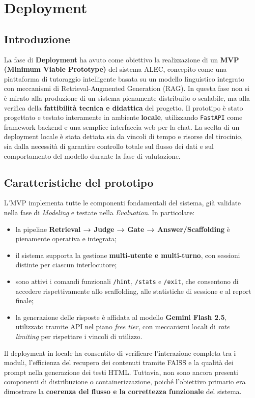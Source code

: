 \documentclass[a4paper,9pt]{article}
\begin{document}
\section{Deployment}

\subsection{Introduzione}

La fase di \textbf{Deployment} ha avuto come obiettivo la realizzazione di un \textbf{MVP (Minimum Viable Prototype)} del sistema ALEC, concepito come una piattaforma di tutoraggio intelligente basata su un modello linguistico integrato con meccanismi di Retrieval-Augmented Generation (RAG). 
In questa fase non si è mirato alla produzione di un sistema pienamente distribuito o scalabile, ma alla verifica della \textbf{fattibilità tecnica e didattica} del progetto.
Il prototipo è stato progettato e testato interamente in ambiente \textbf{locale}, utilizzando \texttt{FastAPI} come framework backend e una semplice interfaccia web per la chat. 
La scelta di un deployment locale è stata dettata sia da vincoli di tempo e risorse del tirocinio, sia dalla necessità di garantire controllo totale sul flusso dei dati e sul comportamento del modello durante la fase di valutazione.

\subsection{Caratteristiche del prototipo}

L'MVP implementa tutte le componenti fondamentali del sistema, già validate nella fase di \textit{Modeling} e testate nella \textit{Evaluation}. 
In particolare:
\begin{itemize}
	\item la pipeline \textbf{Retrieval → Judge → Gate → Answer/Scaffolding} è pienamente operativa e integrata;
	\item il sistema supporta la gestione \textbf{multi-utente e multi-turno}, con sessioni distinte per ciascun interlocutore;
	\item sono attivi i comandi funzionali \texttt{/hint}, \texttt{/stats} e \texttt{/exit}, che consentono di accedere rispettivamente allo scaffolding, alle statistiche di sessione e al report finale;
	\item la generazione delle risposte è affidata al modello \textbf{Gemini Flash 2.5}, utilizzato tramite API nel piano \textit{free tier}, con meccanismi locali di \textit{rate limiting} per rispettare i vincoli di utilizzo.
\end{itemize}
Il deployment in locale ha consentito di verificare l’interazione completa tra i moduli, l’efficienza del recupero dei contenuti tramite FAISS e la qualità dei prompt nella generazione dei testi HTML.  
Tuttavia, non sono ancora presenti componenti di distribuzione o containerizzazione, poiché l’obiettivo primario era dimostrare la \textbf{coerenza del flusso e la correttezza funzionale} del sistema.
\end{document}
